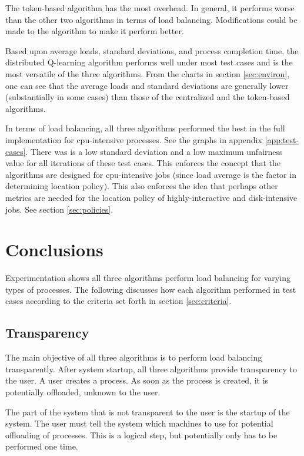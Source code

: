 \documentclass{report}
\begin{document}
The token-based algorithm has the most overhead.  In general, it performs
worse than the other two algorithms in terms of load balancing.
Modifications could be made to the algorithm to make it perform better.

Based upon average loads, standard deviations, and process completion time,
the distributed Q-learning algorithm performs well under most test cases and
is the most versatile of the three algorithms.  From the charts in section
\ref{sec:environ}, one can see that the average loads and standard
deviations are generally lower (substantially in some cases) than those of
the centralized and the token-based algorithms.

In terms of load balancing, all three algorithms performed the best in the
full implementation for cpu-intensive processes.  See the graphs in appendix
\ref{app:test-cases}.  There was is a low standard deviation and a low
maximum unfairness value for all iterations of these test cases.  This
enforces the concept that the algorithms are designed for cpu-intensive jobs
(since load average is the factor in determining location policy).  This also
enforces the idea that perhaps other metrics are needed for the location
policy of highly-interactive and disk-intensive jobs.  See section
\ref{sec:policies}.






\chapter{Conclusions}

Experimentation shows all three algorithms perform load balancing for
varying types of processes.  The following discusses how each algorithm
performed in test cases according to the criteria set forth in section
\ref{sec:criteria}.

\section{Transparency}

The main objective of all three algorithms is to perform load balancing
transparently.  After system startup, all three algorithms provide
transparency to the user.  A user creates a process.  As soon as the process
is created, it is potentially offloaded, unknown to the user.

The part of the system that is not transparent to the user is the startup of
the system.  The user must tell the system which machines to use for
potential offloading of processes.  This is a logical step, but potentially
only has to be performed one time.
\end{document}
